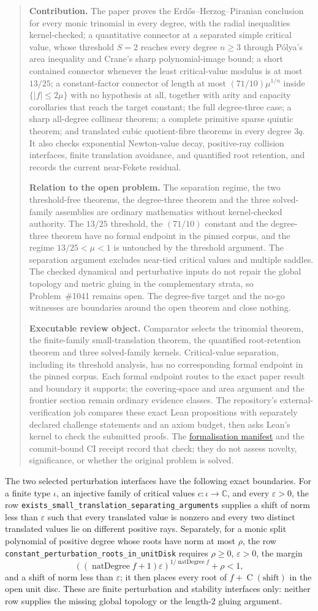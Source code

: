 \documentclass[11pt]{article}
\renewcommand{\externalreviewobject}[3]{%
  \begin{quote}\small
  \textbf{Contribution.} #1\par
  \textbf{Relation to the open problem.} #2\par
  \textbf{Executable review object.} #3  The repository's
  external-verification job compares these exact Lean propositions with
  separately declared challenge statements and an axiom budget, then asks
  Lean's kernel to check the submitted proofs.  The
  \href{https://github.com/wcook04/plectis-erdos/blob/ca0e13f8acf5ccf48506e4bdb870953d3a0856fa/formalization.yaml}%
  {formalisation manifest} and the commit-bound CI receipt record that check;
  they do not assess novelty, significance, or whether the original problem is
  solved.
  \end{quote}}
\begin{document}
\externalreviewobject{The paper proves the Erd\H{o}s--Herzog--Piranian
conclusion for every monic trinomial in every degree, with the radial
inequalities kernel-checked; a quantitative connector at a separated simple
critical value, whose threshold $S=2$ reaches every degree $n\ge3$ through
P\'olya's area inequality and Crane's sharp polynomial-image bound; a short
contained connector whenever the least critical-value modulus is at most
$13/25$; a constant-factor connector of length at most $(71/10)\mu^{1/n}$
inside $\{|f|\le2\mu\}$ with no hypothesis at all, together with arity and
capacity corollaries that reach the target constant; the full degree-three
case; a sharp all-degree collinear theorem; a complete primitive sparse
quintic theorem; and translated cubic quotient-fibre theorems in every degree
$3q$.  It also checks exponential Newton-value decay, positive-ray collision
interfaces, finite translation avoidance, and quantified root retention, and
records the current near-Fekete residual.}{The separation regime, the two
threshold-free theorems, the degree-three theorem and the three solved-family
assemblies are ordinary mathematics without kernel-checked authority.  The
$13/25$ threshold, the $(71/10)$ constant and the degree-three theorem have no
formal endpoint in the pinned corpus, and the regime $13/25<\mu<1$ is
untouched by the threshold argument.  The separation argument excludes
near-tied critical values and multiple saddles.  The checked dynamical and
perturbative inputs do not repair the global topology and metric gluing in the
complementary strata, so Problem~\#1041 remains open.  The degree-five target
and the no-go witnesses are boundaries around the open theorem and close
nothing.}{Comparator selects the trinomial theorem, the finite-family
small-translation theorem, the quantified root-retention theorem and three
solved-family kernels.  Critical-value separation, including its threshold
analysis, has no corresponding formal endpoint in the pinned corpus.  Each
formal endpoint routes to the exact paper result and boundary it supports; the
covering-space and area argument and the frontier section remain ordinary
evidence classes.}

The two selected perturbation interfaces have the following exact boundaries.
For a finite type $\iota$, an injective family of critical values
$c\colon\iota\to\mathbb C$, and every $\varepsilon>0$, the row
\texttt{exists\_small\_translation\_separating\_arguments} supplies a shift
of norm less than $\varepsilon$ such that every translated value is nonzero
and every two distinct translated values lie on different positive rays.
Separately, for a monic split polynomial of positive degree whose roots have
norm at most $\rho$, the row
\texttt{constant\_perturbation\_roots\_in\_unitDisk} requires $\rho\ge0$,
$\varepsilon>0$, the margin
\[
 ((\operatorname{natDegree}f+1)\varepsilon)^{1/\operatorname{natDegree}f}
   +\rho<1,
\]
and a shift of norm less than $\varepsilon$; it then places every root of
$f+\operatorname{C}(\text{shift})$ in the open unit disc.  These are finite
perturbation and stability interfaces only: neither row supplies the missing
global topology or the length-$2$ gluing argument.
\end{document}
